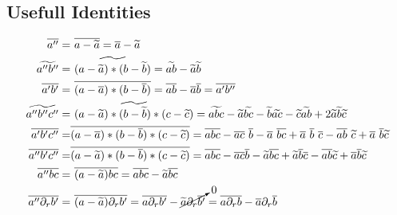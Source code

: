 \documentclass[11pt,paper=a4]{report}
\newcommand{\eht}{\overline}
\newcommand{\fht}{\widetilde}
\def\erho{\eht{\rho}}
\begin{document}

\subsection{Usefull Identities}
\label{sect:usefulidentities}

\begin{align}
\eht{a''} = & \ \eht{a - \fht{a}} = \eht{a} - \fht{a}   \\
\fht{a''b''} = & \ \fht{(a-\fht{a})*(b-\fht{b})} = \fht{ab} - \fht{a}\fht{b} \\
\eht{a'b'} = & \ \eht{(a - \eht{a})*(b-\eht{b})} = \eht{ab}-\eht{a}\eht{b} = \eht{a'b''}\\
\fht{a''b''c''} = & \ \fht{(a-\fht{a})*(b-\fht{b})*(c-\fht{c})} = \fht{abc} - \fht{a}\fht{bc} - \fht{b}\fht{ac} - \fht{c}\fht{ab} + 2\fht{a}\fht{b}\fht{c} \\
\eht{a'b'c''} = & \eht{(a-\eht{a})*(b-\eht{b})*(c-\fht{c})} = \eht{abc} - \eht{ac} \ \eht{b} - \eht{a} \ \eht{bc} + \eht{a} \ \eht{b} \ \eht{c} - \eht{ab} \ \fht{c} + \eht{a} \ \eht{b} \fht{c} \\
\eht{a''b'c''} = & \eht{(a-\fht{a})*(b-\eht{b})*(c-\fht{c})} = \eht{abc} - \eht{ac}\eht{b} - \fht{a}\eht{bc} + \fht{a}\eht{b}\eht{c} - \eht{ab}\fht{c} + \eht{a}\eht{b}\fht{c} \\
\eht{a''bc} = & \ \eht{(a-\fht{a})bc} = \eht{abc} - \fht{a}\eht{bc} \\
\eht{a''\partial_r b'} = & \ \eht{(a-\fht{a})\partial_r b'} = \eht{a \partial_r b'} - \cancelto{0}{\fht{a}\partial_r \eht{b'}} = \eht{a \partial_r b} - \eht{a}\partial_r\eht{b}   
\end{align}





\end{document}
